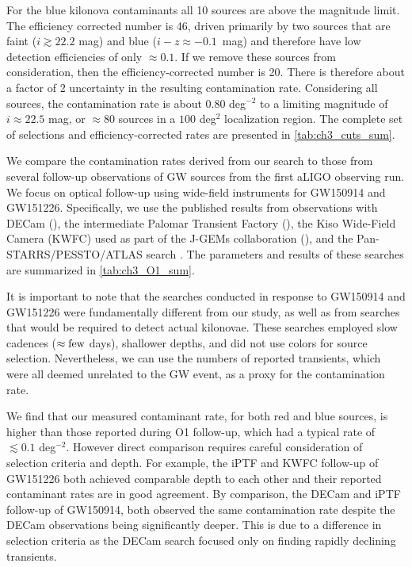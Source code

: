 For the blue kilonova contaminants all 10 sources are above the magnitude limit. The efficiency corrected number is 46, driven primarily by two sources that are faint ($i \gtrsim 22.2$ mag) and blue ($i-z \approx -0.1$~mag) and therefore have low detection efficiencies of only $\approx 0.1$. If we remove these sources from consideration, then the efficiency-corrected number is 20. There is therefore about a factor of 2 uncertainty in the resulting contamination rate. Considering all sources, the contamination rate is about 0.80 deg$^{-2}$ to a limiting magnitude of $i\approx 22.5$ mag, or $\approx 80$ sources in a $100$ deg$^2$ localization region. The complete set of selections and efficiency-corrected rates are presented in \cref{tab:ch3_cuts_sum}.

We compare the contamination rates derived from our search to those from several follow-up observations of GW sources from the first aLIGO observing run. We focus on optical follow-up using wide-field instruments for GW150914 and
GW151226. Specifically, we use the published results from observations with DECam (\citealt{GW150914DECam,Cowp+16}), the intermediate Palomar Transient Factory (\citealt{Kasliwal+16}), the Kiso Wide-Field Camera (KWFC) used as part of the J-GEMs collaboration (\citealt{Morokuma+16,Yoshida+17}), and the Pan-STARRS/PESSTO/ATLAS search \citep{GW150914PS1,GW151226PS1}. The parameters and results of these searches are summarized in \cref{tab:ch3_O1_sum}.

It is important to note that the searches conducted in response to GW150914 and GW151226 were fundamentally different from our study, as well as from searches that would be required to detect actual kilonovae. These searches employed slow cadences ($\approx \rm few$ days), shallower depths, and did not use colors for source selection. Nevertheless, we can use the numbers of reported transients, which were all deemed unrelated to the GW event, as a proxy for the contamination rate.

We find that our measured contaminant rate, for both red and blue sources, is higher than those reported during O1 follow-up, which had a typical rate of  $\lesssim 0.1$ deg$^{-2}$. However direct comparison requires careful consideration of selection criteria and depth. For example, the iPTF and KWFC follow-up of GW151226 both achieved comparable depth to each other and their reported contaminant rates are in good agreement. By comparison, the DECam and iPTF follow-up of GW150914, both observed the same contamination rate despite the DECam observations being significantly deeper. This is due to a difference in selection criteria as the DECam search focused only on finding rapidly declining transients.


